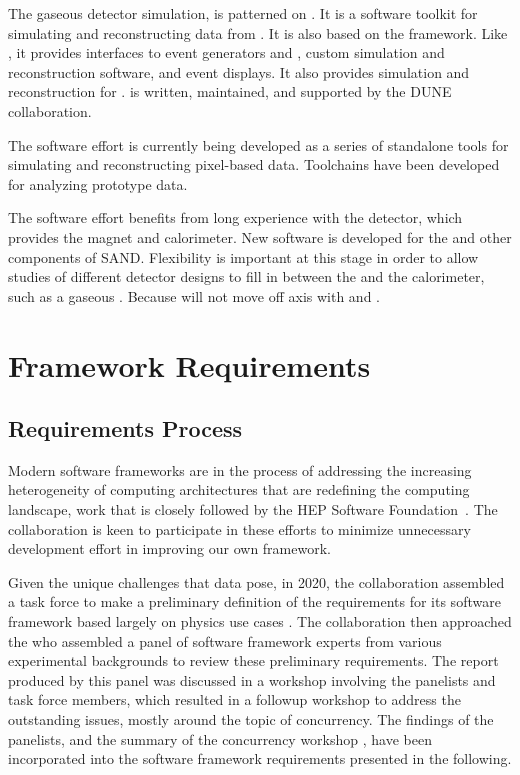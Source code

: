 \documentclass[../main-v1.tex]{subfiles}
\begin{document}

The gaseous detector simulation,  is patterned on .  It is a software toolkit for simulating and reconstructing data from .  It is also based on the  framework.  Like , it provides interfaces to event generators and , custom simulation and reconstruction software, and event displays.  It also provides simulation and reconstruction for .   is written, maintained, and supported by the DUNE collaboration.

The  software effort is currently being developed as a series of standalone tools for simulating and reconstructing pixel-based  data.  Toolchains have been developed for analyzing  prototype data.

The  software effort benefits from long experience with the  detector, which provides the magnet and calorimeter.  New software is developed for the  and other components of SAND.  Flexibility is important at this stage in order to allow studies of different detector designs to fill in between the  and the calorimeter, such as a gaseous .  Because  will not move off axis with  and .


\section{Framework Requirements }
\subsection{Requirements Process} %
Modern  software frameworks are in the process of addressing the increasing heterogeneity of computing architectures that are redefining the computing landscape, work that is closely followed by the HEP Software Foundation~\cite{Alves:2017she, Calafiura:2018rwe}. The  collaboration is keen to participate in these efforts to minimize unnecessary development effort in improving our own framework. 

Given the unique challenges that  data pose, in 2020, the collaboration assembled a task force to make a preliminary definition of the requirements for its software framework based largely on physics use cases \cite{bib:docdb21934}.  The collaboration then approached the  who assembled a panel of software framework experts from various experimental backgrounds to review these preliminary requirements. The report \cite{bib:docdb24423} produced by this panel was discussed in a workshop involving the panelists and task force members, which resulted in a followup workshop to address the outstanding issues, mostly around the topic of concurrency.  The findings of the panelists, and the summary of the concurrency workshop \cite{bib:docdb24426}, have been incorporated into the  software framework requirements presented in the following.
\end{document}
